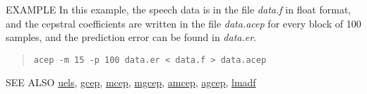 \begin{qsection}{EXAMPLE}
	In this example, the speech data is in the file {\em data.f}
        in float format, and the cepstral coefficients are written in
        the file {\em data.acep} for every block of 100 samples,
        and the prediction error can be found in {\em data.er}.
 \begin{quote}
	\verb!acep -m 15 -p 100 data.er < data.f > data.acep!
 \end{quote} 
\end{qsection}

\begin{qsection}{SEE ALSO}
\hyperlink{uels}{uels}, 
\hyperlink{gcep}{gcep}, 
\hyperlink{mcep}{mcep}, 
\hyperlink{mgcep}{mgcep},
\hyperlink{amcep}{amcep},
\hyperlink{agcep}{agcep},
\hyperlink{lmadf}{lmadf}
\end{qsection}

